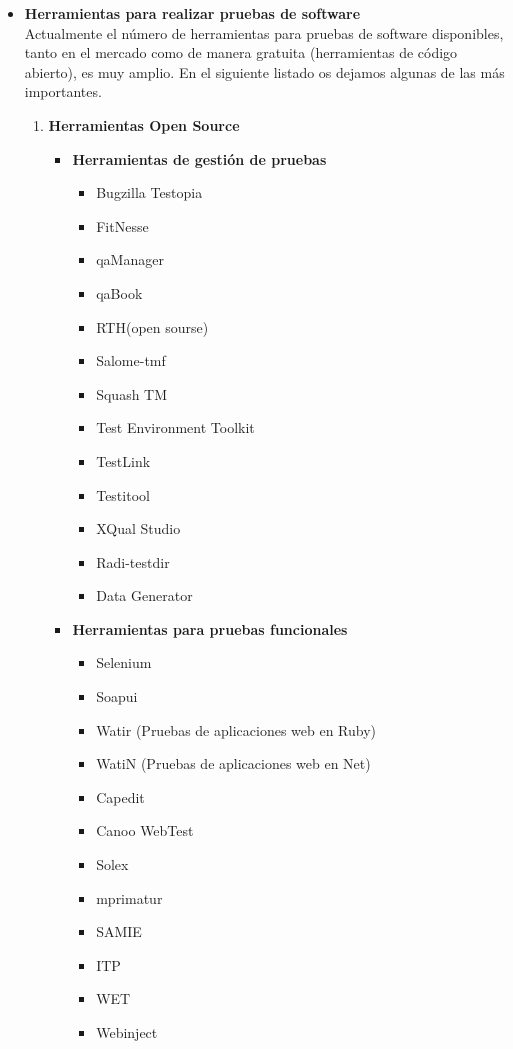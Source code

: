 \documentclass[12pt,a4paper,oneside]{book}
\begin{document}
\begin{enumerate}
\begin{itemize}
\begin{itemize}
						\end{itemize}
				
				
				\item \textbf{Herramientas para realizar pruebas de software }\\
					Actualmente el número de herramientas para pruebas de software disponibles, tanto en el mercado como de manera gratuita (herramientas de código abierto), es muy amplio. En el siguiente listado os dejamos algunas de las más importantes.\\
					
					\begin{enumerate}
						\item \textbf{Herramientas Open Source}
							\begin{itemize}
								\item \textbf{Herramientas de gestión de pruebas}
								\begin{itemize}
									\item Bugzilla Testopia
									\item FitNesse
									\item qaManager
									\item qaBook
									\item RTH(open sourse)
									\item Salome-tmf
									\item Squash TM
									\item Test Environment Toolkit
									\item TestLink
									\item Testitool
									\item XQual Studio
									\item Radi-testdir
									\item Data Generator
									
								\end{itemize}
								
								\item \textbf{Herramientas para pruebas funcionales}
									\begin{itemize}
										\item Selenium
										\item Soapui
										\item Watir (Pruebas de aplicaciones web en Ruby)
										\item WatiN (Pruebas de aplicaciones web en Net)
										\item Capedit
										\item Canoo WebTest
										\item Solex
										\item mprimatur
										\item SAMIE
										\item ITP
										\item WET
										\item Webinject
										

\end{itemize}
\end{itemize}
\end{enumerate}
\end{itemize}
\end{enumerate}
\end{document}

